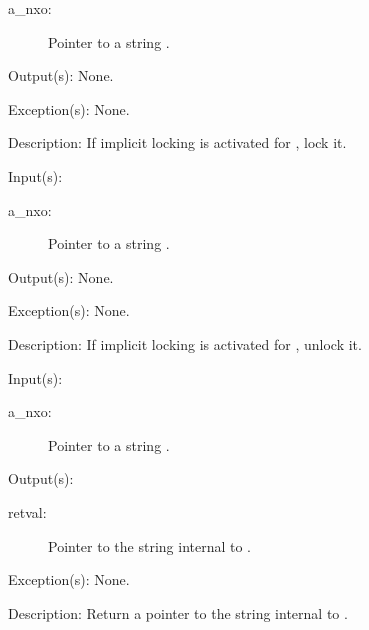 \begin{capi}
\begin{capilist}
		\begin{description}\item[]
		\item[a\_nxo: ]
			Pointer to a string .
		\end{description}
	\item[Output(s): ] None.
	\item[Exception(s): ] None.
	\item[Description: ]
		If implicit locking is activated for , lock it.
	\end{capilist}
\label{nxo_string_unlock}
	\begin{capilist}
	\item[Input(s): ]
		\begin{description}\item[]
		\item[a\_nxo: ]
			Pointer to a string .
		\end{description}
	\item[Output(s): ] None.
	\item[Exception(s): ] None.
	\item[Description: ]
		If implicit locking is activated for , unlock it.
	\end{capilist}
\label{nxo_string_get}
	\begin{capilist}
	\item[Input(s): ]
		\begin{description}\item[]
		\item[a\_nxo: ]
			Pointer to a string \classname{nxo}.
		\end{description}
	\item[Output(s): ]
		\begin{description}\item[]
		\item[retval: ]
			Pointer to the string internal to \cvar{a\_nxo}.
		\end{description}
	\item[Exception(s): ] None.
	\item[Description: ]
		Return a pointer to the string internal to \cvar{a\_nxo}.
	\end{capilist}
\label{nxo_string_set}

\end{capi}
